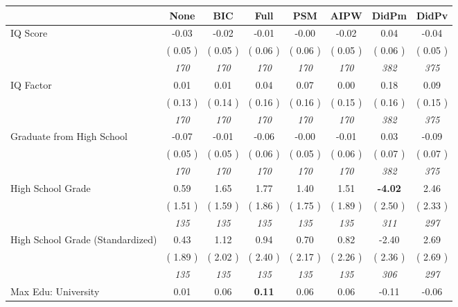 \begin{tabular}{l c c c c c c c}
\toprule
 & None & BIC & Full & PSM & AIPW & DidPm & DidPv \\
\midrule
IQ Score &     -0.03 &     -0.02 &     -0.01 &     -0.00 &     -0.02 &      0.04 &     -0.04 \\
& (     0.05 ) & (     0.05 ) & (     0.06 ) & (     0.06 ) & (     0.05 ) & (     0.06 ) & (     0.05 ) \\
& \textit{ 170 } & \textit{ 170 } & \textit{ 170 } & \textit{ 170 } & \textit{ 170 } & \textit{ 382 } & \textit{ 375 } \\
IQ Factor &      0.01 &      0.01 &      0.04 &      0.07 &      0.00 &      0.18 &      0.09 \\
& (     0.13 ) & (     0.14 ) & (     0.16 ) & (     0.16 ) & (     0.15 ) & (     0.16 ) & (     0.15 ) \\
& \textit{ 170 } & \textit{ 170 } & \textit{ 170 } & \textit{ 170 } & \textit{ 170 } & \textit{ 382 } & \textit{ 375 } \\
Graduate from High School &     -0.07 &     -0.01 &     -0.06 &     -0.00 &     -0.01 &      0.03 &     -0.09 \\
& (     0.05 ) & (     0.05 ) & (     0.06 ) & (     0.05 ) & (     0.06 ) & (     0.07 ) & (     0.07 ) \\
& \textit{ 170 } & \textit{ 170 } & \textit{ 170 } & \textit{ 170 } & \textit{ 170 } & \textit{ 382 } & \textit{ 375 } \\
High School Grade &      0.59 &      1.65 &      1.77 &      1.40 &      1.51 & \textbf{     -4.02 } &      2.46 \\
& (     1.51 ) & (     1.59 ) & (     1.86 ) & (     1.75 ) & (     1.89 ) & (     2.50 ) & (     2.33 ) \\
& \textit{ 135 } & \textit{ 135 } & \textit{ 135 } & \textit{ 135 } & \textit{ 135 } & \textit{ 311 } & \textit{ 297 } \\
High School Grade (Standardized) &      0.43 &      1.12 &      0.94 &      0.70 &      0.82 &     -2.40 &      2.69 \\
& (     1.89 ) & (     2.02 ) & (     2.40 ) & (     2.17 ) & (     2.26 ) & (     2.36 ) & (     2.69 ) \\
& \textit{ 135 } & \textit{ 135 } & \textit{ 135 } & \textit{ 135 } & \textit{ 135 } & \textit{ 306 } & \textit{ 297 } \\
Max Edu: University &      0.01 &      0.06 & \textbf{      0.11 } &      0.06 &      0.06 &     -0.11 &     -0.06 \\

\end{tabular}
